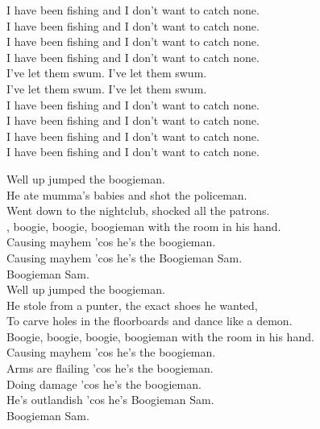 I have been fishing and I don't want to catch none. \\
I have been fishing and I don't want to catch none. \\
I have been fishing and I don't want to catch none. \\
I have been fishing and I don't want to catch none. \\

I've let them swum. I've let them swum. \\
I've let them swum. I've let them swum. \\

I have been fishing and I don't want to catch none. \\
I have been fishing and I don't want to catch none. \\
I have been fishing and I don't want to catch none. \\
I have been fishing and I don't want to catch none. \\




Well up jumped the boogieman. \\
He ate mumma's babies and shot the policeman. \\
Went down to the nightclub, shocked all the patrons. \\
, boogie, boogie, boogieman with the room in his hand. \\
Causing mayhem 'cos he's the boogieman. \\
Causing mayhem 'cos he's the Boogieman Sam. \\
Boogieman Sam. \\

Well up jumped the boogieman. \\
He stole from a punter, the exact shoes he wanted, \\
To carve holes in the floorboards and dance like a demon. \\
Boogie, boogie, boogie, boogieman with the room in his hand. \\
Causing mayhem 'cos he's the boogieman. \\
Arms are flailing 'cos he's the boogieman. \\
Doing damage 'cos he's the boogieman. \\
He's outlandish 'cos he's Boogieman Sam. \\
Boogieman Sam. \\

